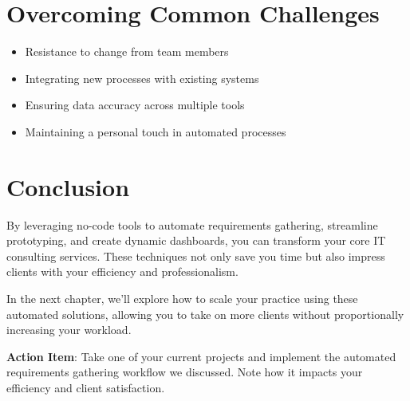 \section{Overcoming Common Challenges}

\begin{itemize}
    \item Resistance to change from team members
    \item Integrating new processes with existing systems
    \item Ensuring data accuracy across multiple tools
    \item Maintaining a personal touch in automated processes
\end{itemize}


\section{Conclusion}

By leveraging no-code tools to automate requirements gathering, streamline prototyping, and create dynamic dashboards, you can transform your core IT consulting services. These techniques not only save you time but also impress clients with your efficiency and professionalism.

In the next chapter, we'll explore how to scale your practice using these automated solutions, allowing you to take on more clients without proportionally increasing your workload.

\textbf{Action Item}: Take one of your current projects and implement the automated requirements gathering workflow we discussed. Note how it impacts your efficiency and client satisfaction.

